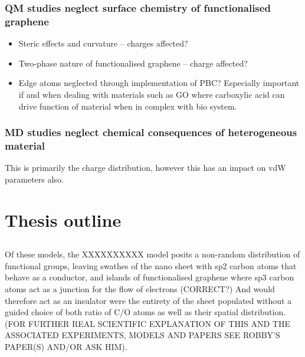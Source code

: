 
\subsubsection{QM studies neglect surface chemistry of functionalised graphene}
\begin{itemize}
    \item Steric effects and curvature -- charges affected?
    \item Two-phase nature of functionalised graphene -- charge affected?
    \item Edge atoms neglected through implementation of PBC? Especially important if and when dealing with materials such as GO where carboxylic acid can drive function of material when in complex with bio system.
\end{itemize}

\subsubsection{MD studies neglect chemical consequences of heterogeneous material}
This is primarily the charge distribution, however this has an impact on vdW parameters also.


\newpage
\section{Thesis outline}
\subsection{}
Of these models, the XXXXXXXXXX model posits a non-random distribution of functional groups, leaving swathes of the nano sheet with sp2 carbon atoms that behave as a conductor, and islands of functionalised graphene where sp3 carbon atoms act as a junction for the flow of electrons (CORRECT?) And would therefore act as an insulator were the entirety of the sheet populated without a guided choice of both ratio of C/O atoms as well as their spatial distribution. (FOR FURTHER REAL SCIENTIFIC EXPLANATION OF THIS AND THE ASSOCIATED EXPERIMENTS, MODELS AND PAPERS SEE ROBBY’S PAPER(S) AND/OR ASK HIM). 

